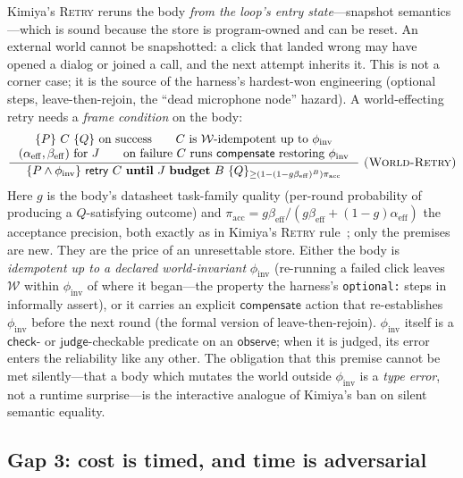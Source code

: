 \documentclass[acmsmall,screen,nonacm]{acmart}
\newcommand{\checkk}{\mathsf{check}}
\newcommand{\judge}{\mathsf{judge}}
\newcommand{\retry}{\mathsf{retry}}
\newcommand{\observe}{\mathsf{observe}}
\newcommand{\budget}{B}
\newcommand{\ir}[3]{\dfrac{\;#2\;}{\;#3\;}\ \textsc{(#1)}}
\newcommand{\worldstore}{\mathcal{W}}
\theoremstyle{acmdefinition}%
\theoremstyle{acmplain}%
\begin{document}
Kimiya's \textsc{Retry} reruns the body \emph{from the loop's entry
state}---snapshot semantics---which is sound because the store is
program-owned and can be reset. An external world cannot be snapshotted: a
click that landed wrong may have opened a dialog or joined a call, and the
next attempt inherits it. This is not a corner case; it is the source of
the harness's hardest-won engineering (optional steps, leave-then-rejoin,
the ``dead microphone node'' hazard). A world-effecting retry needs a
\emph{frame condition} on the body:
\[
\ir{World-Retry}{
\begin{array}{c}
\{P\}\ C\ \{Q\}\ \text{on success} \qquad
C\ \text{is } \worldstore\text{-idempotent up to } \phi_{\mathrm{inv}} \\
(\alpha_{\mathrm{eff}},\beta_{\mathrm{eff}})\ \text{for } J \qquad
\text{on failure } C\ \text{runs } \mathsf{compensate}\ \text{restoring } \phi_{\mathrm{inv}}
\end{array}}
{\{P\wedge\phi_{\mathrm{inv}}\}\ \retry\ C\ \mathbf{until}\ J\
\mathbf{budget}\ \budget\ \{Q\}_{\ge(1-(1-g\beta_{\mathrm{eff}})^\budget)\pi_{\mathrm{acc}}}}
\]
Here $g$ is the body's datasheet task-family quality (per-round
probability of producing a $Q$-satisfying outcome) and
$\pi_{\mathrm{acc}}=g\beta_{\mathrm{eff}}/(g\beta_{\mathrm{eff}}+(1-g)\alpha_{\mathrm{eff}})$
the acceptance precision, both exactly as in Kimiya's \textsc{Retry}
rule~\citep{kimiya}; only the premises are new. They are the price of an
unresettable store. Either the body
is \emph{idempotent up to a declared world-invariant} $\phi_{\mathrm{inv}}$
(re-running a failed click leaves $\worldstore$ within $\phi_{\mathrm{inv}}$
of where it began---the property the harness's \texttt{optional:} steps in
informally assert), or it carries an explicit $\mathsf{compensate}$ action
that re-establishes $\phi_{\mathrm{inv}}$ before the next round (the
formal version of leave-then-rejoin). $\phi_{\mathrm{inv}}$ itself is a
$\checkk$- or $\judge$-checkable predicate on an $\observe$; when it is
judged, its error enters the reliability like any other. The obligation
that this premise cannot be met silently---that a body which mutates the
world outside $\phi_{\mathrm{inv}}$ is a \emph{type error}, not a runtime
surprise---is the interactive analogue of Kimiya's ban on silent semantic
equality.

\subsection{Gap 3: cost is timed, and time is adversarial}
\end{document}
